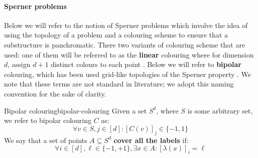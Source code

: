 %
%

\paragraph{Sperner problems}

Below we will refer to the notion of Sperner problems which involve
the idea of using the topology of a problem and a colouring scheme to ensure
that a substructure is panchromatic. There two variants of colouring scheme
that are used: one of them will be referred to as the \textbf{linear} colouring
where for dimension $d$, assign $d+1$ distinct colours to each point \cite{daskalakis_ComplexityComputingNash_2006, chen_Complexity2DDiscrete_2009}.
Below we will refer to \textbf{bipolar} colouring, which has been used grid-like topologies of the Sperner property
\cite{chen_SettlingComplexityComputing_2009, deligkas_PureCircuitTightInapproximability_2024, daskalakis_ComplexityConstrainedMinmax_2021}.
We note that these terms are not standard in literature; we adopt this naming convention
for the sake of clarity.



\begin{definitionbox}{Bipolar colouring}{bipolar-colouring}
    Given a set $S^d$, where $S$ is some arbitrary set, we refer
    to bipolar colouring $C$ as:
    $$
    \forall v \in S, j \in [d]: [C(v)]_j \in \{-1,1\}
    $$
    We say that a set of points $A \subseteq S^d$ \textbf{cover all the labels} if:
    $$
        \forall i \in [d], \ell \in \{-1, +1\}, \exists x \in A: [\lambda(x)]_{i} = \ell
    $$

\end{definitionbox}

